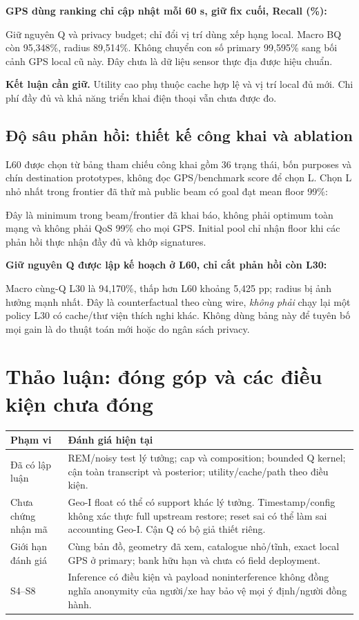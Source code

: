 \documentclass[10pt,a4paper]{article}
\newcommand{\claim}[1]{\par\textbf{Kết luận cần giữ.} #1\par}
\begin{document}
\textbf{GPS dùng ranking chỉ cập nhật mỗi 60 s, giữ fix cuối, Recall (\%):}
\begin{small}\end{small}
Giữ nguyên Q và privacy budget; chỉ đổi vị trí dùng xếp hạng local. Macro BQ còn 95,348\%, radius 89,514\%.
Không chuyển con số primary 99,595\% sang bối cảnh GPS local cũ này. Đây chưa là dữ liệu sensor thực địa được hiệu chuẩn.

\claim{Utility cao phụ thuộc cache hợp lệ và vị trí local đủ mới. Chi phí đầy đủ và khả năng triển khai điện thoại vẫn chưa được đo.}

\clearpage
\subsection{Độ sâu phản hồi: thiết kế công khai và ablation}
L60 được chọn từ bảng tham chiếu công khai gồm 36 trạng thái, bốn purposes và chín destination prototypes,
không đọc GPS/benchmark score để chọn L. Chọn L nhỏ nhất trong frontier đã thử mà public beam có goal đạt mean floor 99\%:
\begin{small}\end{small}
Đây là minimum trong beam/frontier đã khai báo, không phải optimum toàn mạng và không phải QoS 99\% cho mọi GPS.
Initial pool chỉ nhận floor khi các phản hồi thực nhận đầy đủ và khớp signatures.

\textbf{Giữ nguyên Q được lập kế hoạch ở L60, chỉ cắt phản hồi còn L30:}
\begin{small}\end{small}
Macro cùng-Q L30 là 94,170\%, thấp hơn L60 khoảng 5,425 pp; radius bị ảnh hưởng mạnh nhất.
Đây là counterfactual theo cùng wire, \emph{không phải} chạy lại một policy L30 có cache/thư viện thích nghi khác.
Không dùng bảng này để tuyên bố mọi gain là do thuật toán mới hoặc do ngân sách privacy.

\section{Thảo luận: đóng góp và các điều kiện chưa đóng}
\begin{tabularx}{\linewidth}{@{}P{3cm}Y@{}}\toprule
\textbf{Phạm vi} & \textbf{Đánh giá hiện tại}\\\midrule
Đã có lập luận & REM/noisy test lý tưởng; cap và composition; bounded Q kernel; cận toàn transcript và posterior; utility/cache/path theo điều kiện.\\
Chưa chứng nhận mã & Geo-I float có thể có support khác lý tưởng. Timestamp/config không xác thực full upstream restore; reset sai có thể làm sai accounting Geo-I. Cận Q có bộ giả thiết riêng.\\
Giới hạn đánh giá & Cùng bản đồ, geometry đã xem, catalogue nhỏ/tĩnh, exact local GPS ở primary; bank hữu hạn và chưa có field deployment.\\
S4--S8 & Inference có điều kiện và payload noninterference không đồng nghĩa anonymity của người/xe hay bảo vệ mọi ý định/người đồng hành.\\\bottomrule
\end{tabularx}
\end{document}
